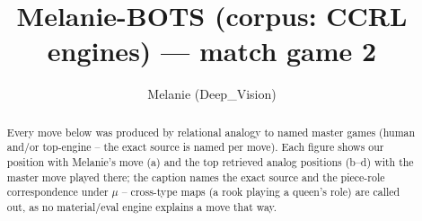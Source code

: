 \documentclass[11pt]{article}
\title{Melanie-BOTS (corpus: CCRL engines) — match game 2}
\author{Melanie (Deep\_Vision)}
\date{}
\begin{document}
\maketitle

\begin{abstract}Every move below was produced by relational analogy to named master games (human and/or top-engine -- the exact source is named per move). Each figure shows our position with Melanie's move (a) and the top retrieved analog positions (b--d) with the master move played there; the caption names the exact source and the piece-role correspondence under $\mu$ -- cross-type maps (a rook playing a queen's role) are called out, as no material/eval engine explains a move that way.\end{abstract}

\begin{figure}[p]\centering
\begin{subfigure}{0.46\textwidth}\centering
\resizebox{\linewidth}{!}{%
\newchessgame
\chessboard[
  setfen={r1bq1rk1/pppp1ppp/3n1b2/4R3/3P4/8/PPP2PPP/RNBQ1BK1 w - - 1 10},
  showmover=false,
  pgfstyle=straightmove, color=movearrow, markmove={e5-e1}
]}
\caption{}
\end{subfigure}\hfill
\begin{subfigure}{0.46\textwidth}\centering
\resizebox{\linewidth}{!}{%
\newchessgame
\chessboard[
  setfen={r1bqnrk1/pppp1ppp/5b2/4R3/2PP4/8/PP3PPP/RNBQ1BK1 w - - 1 11},
  showmover=false,
  pgfstyle=straightmove, color=movearrow, markmove={e5-e1}
]}
\caption{}
\end{subfigure}
\\[4pt]
\begin{subfigure}{0.46\textwidth}\centering
\resizebox{\linewidth}{!}{%
\newchessgame
\chessboard[
  setfen={r1bq1rk1/pppp1ppp/3n1b2/4R3/3P4/8/PPP2PPP/RNBQ1BK1 w - - 1 10},
  showmover=false,
  pgfstyle=straightmove, color=movearrow, markmove={e5-e1}
]}
\caption{}
\end{subfigure}\hfill
\begin{subfigure}{0.46\textwidth}\centering
\resizebox{\linewidth}{!}{%
\newchessgame
\chessboard[
  setfen={r1bq1rk1/pppp1ppp/3n1b2/4R3/3P4/8/PPP2PPP/RNBQ1BK1 w - - 1 10},
  showmover=false,
  pgfstyle=straightmove, color=movearrow, markmove={e5-e1}
]}
\caption{}
\end{subfigure}

\end{figure}
\end{document}
